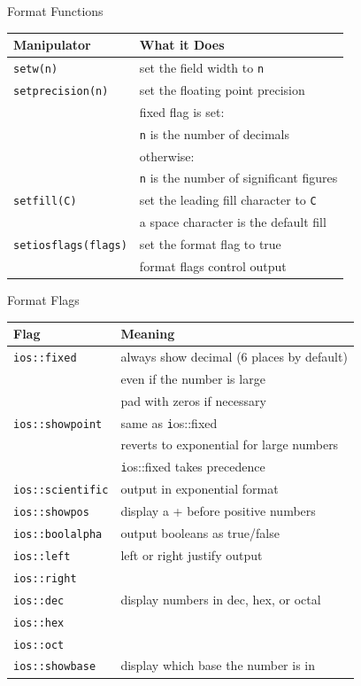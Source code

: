 \documentclass[xcolor={dvipsnames}]{beamer}
\begin{document}
\begin{frame}{Format Functions}
\begin{tabular}{|l|l|}
\hline
\textbf{Manipulator} & \textbf{What it Does} \\
\hline
\texttt{setw(n)} & set the field width to \texttt n \\
\hline
\texttt{setprecision(n)} & set the floating point precision \\
			    & fixed flag is set:\\
			    & \texttt{n} is the number of decimals \\
			   & otherwise: \\
			   & \texttt{n} is the number of significant figures\\
\hline
\texttt{setfill(C)} & set the leading fill character to \texttt{C}\\
  		    	& a space character is the default fill\\
\hline
\texttt{setiosflags(flags)}    & set the format flag to true\\
				& format flags control output\\
\hline
\end{tabular}
\end{frame}
\begin{frame}{Format Flags}
\begin{tabular}{ | l|l|}
\hline
\textbf{Flag} & \textbf{Meaning} \\
\hline
\hline
\texttt{ios::fixed} & always show decimal (6 places by default)\\
		       & even if the number is large\\
		       & pad with zeros if necessary\\
\hline
\texttt{ios::showpoint}&  same as \texttt ios::fixed\\
			    & reverts to exponential for large numbers\\
			    &\texttt ios::fixed takes precedence\\

\hline
\hline
\texttt{ios::scientific} & output in exponential format\\
\hline
\texttt{ios::showpos} & display a + before positive numbers \\
\hline
\texttt{ios::boolalpha} & output booleans as true/false\\
\hline
\hline
\texttt{ios::left} & left or right justify output\\
\texttt{ios::right} &\\
\hline
\hline
\texttt{ios::dec} &display  numbers in dec, hex, or octal\\
\texttt{ios::hex} & \\
\texttt{ios::oct} & \\
\hline
\texttt{ios::showbase} & display which base the number is in\\
\hline
\end{tabular}
\end{frame}
\end{document}
